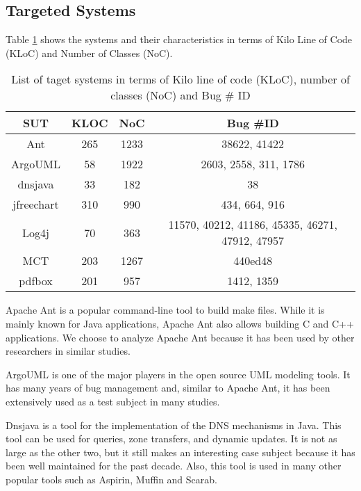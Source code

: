 \subsection{Targeted Systems}

Table \ref{tab:jacharming-systems} shows the systems and their characteristics in terms of
Kilo Line of Code (KLoC) and Number of Classes (NoC).

\begin{table}[h!]
\centering
\begin{tabular}{c|c|c|c}
SUT        & KLOC & NoC  & Bug \#ID                                        \\ \hline \hline
Ant        & 265  & 1233 & 38622, 41422                                    \\
ArgoUML    & 58   & 1922 & 2603, 2558, 311, 1786                           \\
dnsjava    & 33   & 182  & 38                                              \\
jfreechart & 310  & 990  & 434, 664, 916                                   \\
Log4j      & 70   & 363  & 11570, 40212, 41186, 45335, 46271, 47912, 47957 \\
MCT        & 203  & 1267 & 440ed48                                         \\
pdfbox     & 201  & 957  & 1412, 1359 \\ \hline \hline
\end{tabular}
\caption{List of taget systems in terms of Kilo line of code (KLoC), number of classes (NoC) and Bug \# ID}
\label{tab:jacharming-systems}
\end{table}

Apache Ant \cite{ApacheSoftwareFoundation} is a popular command-line tool to build
make files. While it is mainly known for Java applications,
Apache Ant also allows building C and C++ applications. We
choose to analyze Apache Ant because it has been used by
other researchers in similar studies.

ArgoUML \cite{CollabNet} is one of the major players in the open source
UML modeling tools. It has many years of bug management
and, similar to Apache Ant, it has been extensively used as a
test subject in many studies.

Dnsjava \cite{Wellington2013} is a tool for the implementation of the DNS
mechanisms in Java. This tool can be used for queries, zone
transfers, and dynamic updates. It is not as large as the other
two, but it still makes an interesting case subject because it has
been well maintained for the past decade. Also, this tool is
used in many other popular tools such as Aspirin, Muffin and
Scarab.


